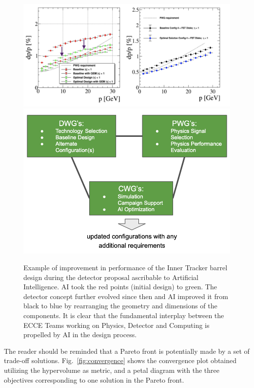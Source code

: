 \begin{figure}[!]
    \centering
    \includegraphics[scale = 0.25]{figs/improve_with_AI.png}
    \includegraphics[scale = 0.35]{figs/interplay.png}
    \caption{
    Example of improvement in performance of the Inner Tracker barrel design during the detector proposal ascribable to Artificial Intelligence. AI took the red points (initial design) to green. The detector concept further evolved since then and AI improved it from black to blue by rearranging the geometry and dimensions of the components. It is clear that the fundamental interplay between the ECCE Teams working on Physics, Detector and Computing is propelled by AI in the design process. 
}
    \label{fig:improved_with_AI}
\end{figure}

The reader should be reminded that a Pareto front is potentially made by a set of trade-off solutions. Fig.~\ref{fig:convergence} shows the convergence plot obtained utilizing the hypervolume as metric, and a petal diagram with the three objectives corresponding to one solution in the Pareto front. 

